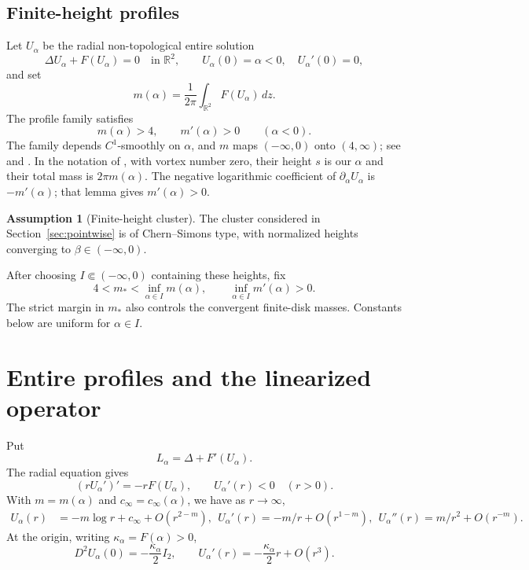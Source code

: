 \documentclass[11pt,reqno]{amsart}
\numberwithin{equation}{section}
\theoremstyle{definition}
\newtheorem{assumption}[theorem]{Assumption}
\theoremstyle{remark}
\newcommand{\R}{\mathbb R}
\begin{document}
\subsection{Finite-height profiles}
Let $U_\alpha$ be the radial non-topological entire solution
\begin{equation}\label{eq:entire}
 \Delta U_\alpha+F(U_\alpha)=0
 \quad\text{in }\R^2,\qquad U_\alpha(0)=\alpha<0,
 \quad U_\alpha'(0)=0,
\end{equation}
and set
\begin{equation}\label{eq:mass-map}
 m(\alpha)=\frac1{2\pi}\int_{\R^2}F(U_\alpha)\,dz.
\end{equation}
The profile family satisfies
\begin{equation}\label{eq:profile-facts}
 m(\alpha)>4,\qquad m'(\alpha)>0\qquad(\alpha<0).
\end{equation}
The family depends $C^1$-smoothly on $\alpha$, and $m$ maps
$(-\infty,0)$ onto $(4,\infty)$;
see \cite{CFL} and \cite[pp.~840--841]{CKL}. In the notation of
\cite[Lemma~2.4]{CKL}, with vortex number zero, their height $s$ is
our $\alpha$ and their total mass is $2\pi m(\alpha)$.
The negative logarithmic coefficient of $\partial_\alpha U_\alpha$
is $-m'(\alpha)$; that lemma gives $m'(\alpha)>0$.
\begin{assumption}[Finite-height cluster]\label{ass:profile}
The cluster considered in Section~\ref{sec:pointwise} is of
Chern--Simons type, with normalized heights converging to
$\beta\in(-\infty,0)$.
\end{assumption}
After choosing $I\Subset(-\infty,0)$ containing these heights, fix
\begin{equation}\label{eq:profile-hyp}
 4<m_*<\inf_{\alpha\in I}m(\alpha),\qquad
 \inf_{\alpha\in I}m'(\alpha)>0.
\end{equation}
The strict margin in $m_*$ also controls the convergent finite-disk
masses. Constants below are uniform for $\alpha\in I$.

\section{Entire profiles and the linearized operator}\label{sec:linearized}
Put
\begin{equation}\label{eq:linearized-operator}
 L_\alpha=\Delta+F'(U_\alpha).
\end{equation}
The radial equation gives
\begin{equation}\label{eq:radial-monotonicity}
 (rU_\alpha')'=-rF(U_\alpha),\qquad U_\alpha'(r)<0\quad(r>0).
\end{equation}
With $m=m(\alpha)$ and $c_\infty=c_\infty(\alpha)$, we have as $r\to\infty$,
\begin{align}
 U_\alpha(r)&=-m\log r+c_\infty+O(r^{2-m}), \ \
 U_\alpha'(r)=-m/r+O(r^{1-m}), \ \
 U_\alpha''(r)=m/r^2+O(r^{-m}).
 \label{eq:Usecond-asymptotic}
\end{align}
At the origin, writing $\kappa_\alpha=F(\alpha)>0$,
\begin{equation}\label{eq:kappa-alpha}
 D^2U_\alpha(0)=-\frac{\kappa_\alpha}{2}I_2,\qquad
 U_\alpha'(r)=-\frac{\kappa_\alpha}{2}r+O(r^3).
\end{equation}
\end{document}
